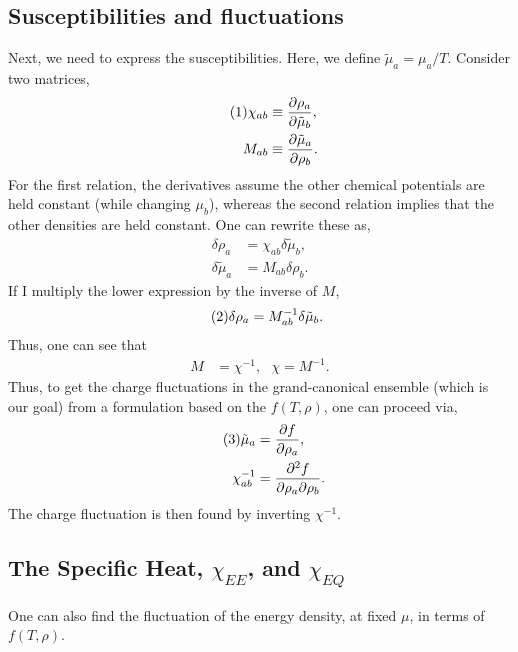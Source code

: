 \documentclass[12pt]{article}
\numberwithin{equation}{section}
\numberwithin{figure}{section}
\newcommand\eqnumber{\addtocounter{equation}{1}\tag{\theequation}}
\begin{document}
\subsection{Susceptibilities and fluctuations}

Next, we need to express the susceptibilities. Here, we define $\tilde{\mu}_a=\mu_a/T$. Consider two matrices,
\begin{align*}\eqnumber
\chi_{ab}&\equiv\frac{\partial\rho_a}{\partial\tilde{\mu}_b},\\
M_{ab}&\equiv\frac{\partial\tilde{\mu}_a}{\partial\rho_b}.
\end{align*}
For the first relation, the derivatives assume the other chemical potentials are held constant (while changing $\mu_b$), whereas the second relation implies that the other densities are held constant. One can rewrite these as,
\begin{align*}
\delta\rho_a&=\chi_{ab}\delta\tilde{\mu}_b,\\
\delta\tilde{\mu}_a&=M_{ab}\delta\rho_b.
\end{align*}
If I multiply the lower expression by the inverse of $M$,
\begin{align*}\eqnumber
\delta\rho_a&=M^{-1}_{ab}\delta\tilde{\mu}_b.
\end{align*}
Thus, one can see that
\begin{align*}
M&=\chi^{-1},~~~\chi=M^{-1}.
\end{align*}
Thus, to get the charge fluctuations in the grand-canonical ensemble (which is our goal) from a formulation based on the $f(T,\rho)$, one can proceed via,
\begin{align*}\eqnumber
\tilde{\mu}_a&=\frac{\partial f}{\partial\rho_a},\\
\chi^{-1}_{ab}&=\frac{\partial^2 f}{\partial\rho_a\partial\rho_b}.
\end{align*}
The charge fluctuation is then found by inverting $\chi^{-1}$.

\subsection{The Specific Heat, $\chi_{EE}$, and $\chi_{EQ}$}

One can also find the fluctuation of the energy density, at fixed $\mu$, in terms of $f(T,\rho)$.
\end{document}
